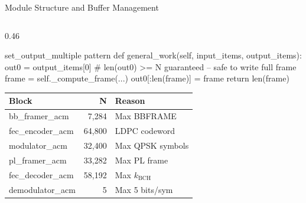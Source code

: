 \documentclass[aspectratio=169,10pt]{beamer}
\begin{document}
\begin{frame}[fragile,shrink=22]{Module Structure and Buffer Management}
\begin{columns}[T]
\begin{column}{0.46\textwidth}
\begin{codeblock}{set\_output\_multiple pattern}
def general_work(self, input_items, output_items):
    out0 = output_items[0]
    # len(out0) >= N guaranteed -- safe to write full frame
    frame = self._compute_frame(...)
    out0[:len(frame)] = frame
    return len(frame)
\end{codeblock}

      {\scriptsize
      \begin{tabular}{lrl}
        \toprule
        \textbf{Block} & \textbf{N} & \textbf{Reason}\\
        \midrule
        bb\_framer\_acm   &  7,284 & Max BBFRAME\\
        fec\_encoder\_acm & 64,800 & LDPC codeword\\
        modulator\_acm    & 32,400 & Max QPSK symbols\\
        pl\_framer\_acm   & 33,282 & Max PL frame\\
        fec\_decoder\_acm & 58,192 & Max $k_\text{BCH}$\\
        demodulator\_acm  &      5 & Max 5 bits/sym\\
        \bottomrule
      \end{tabular}}
    \end{column}
  \end{columns}
\end{frame}
\end{document}
